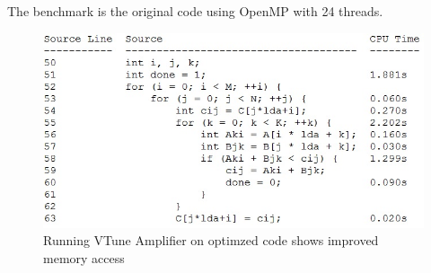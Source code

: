 \documentclass[11pt]{article}
\begin{document}
	The benchmark is the original code using OpenMP with 24 threads.
    
    \begin{figure}[ht!]
    \centering
    \caption{Running VTune Amplifier on optimzed code shows improved memory access}
    \includegraphics{profileBlocked.jpg}
    \end{figure}
    
    
\end{document}
